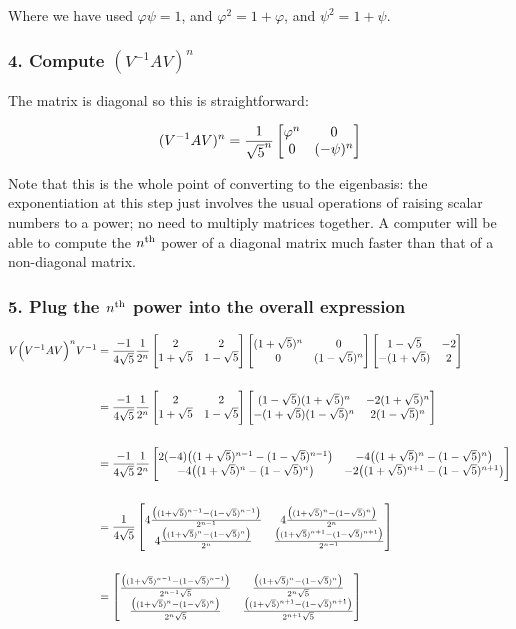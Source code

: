 \begin{lemma}
{Where we have used $\varphi\psi = 1$, and $\varphi^2 = 1 + \varphi$, and $\psi^2 = 1 + \psi$.



\subsubsection{4. Compute $(V^{-1}AV)^n$}

The matrix is diagonal so this is straightforward:

\begin{align*}
(V^{-1}AV)^n = \frac{1}{\sqrt{5}^n} \begin{bmatrix}\varphi^n & 0    \\0  & (-\psi)^n\\ \end{bmatrix}
\end{align*}

Note that this is the whole point of converting to the eigenbasis: the exponentiation at this step
just involves the usual operations of raising scalar numbers to a power; no need to multiply
matrices together. A computer will be able to compute the $n^{\text{th}}$ power of a diagonal matrix much
faster than that of a non-diagonal matrix.



\subsubsection{5. Plug the $n^{\text{th}}$ power into the overall expression}

\begin{align*}
V \Big(V^{-1}AV\Big)^n V^{-1}
&=
\frac{-1}{4\sqrt 5}
\frac{1}{2^n}
\begin{bmatrix}2           & 2          \\1 + \sqrt 5 & 1 - \sqrt 5\\ \end{bmatrix}
\begin{bmatrix}(1 + \sqrt 5)^n & 0              \\0               & (1 - \sqrt 5)^n\\ \end{bmatrix}
\begin{bmatrix}1 - \sqrt 5  & -2\\-(1 + \sqrt 5) & 2\\ \end{bmatrix}
\\\\
&=
\frac{-1}{4\sqrt 5}
\frac{1}{2^n}
\begin{bmatrix}2           & 2          \\1 + \sqrt 5 & 1 - \sqrt 5\\ \end{bmatrix}
\begin{bmatrix}(1 - \sqrt 5)(1 + \sqrt 5)^n & -2(1 + \sqrt 5)^n\\-(1 + \sqrt 5)(1 - \sqrt 5)^n & 2(1 - \sqrt 5)^n\\ \end{bmatrix}
\\\\
&=
\frac{-1}{4\sqrt 5}
\frac{1}{2^n}
\begin{bmatrix}2(-4)\big((1 + \sqrt 5)^{n-1} - (1 - \sqrt 5)^{n-1}\big) & -4\big((1 + \sqrt 5)^n     - (1 - \sqrt 5)^n    \big)\\   -4\big((1 + \sqrt 5)^n     - (1 - \sqrt 5)^n    \big) & -2\big((1 + \sqrt 5)^{n+1} - (1 - \sqrt 5)^{n+1}\big)\\ \end{bmatrix}
\\\\
&=
\frac{1}{4\sqrt 5}
\begin{bmatrix}4\frac{\big((1 + \sqrt 5)^{n-1} - (1 - \sqrt 5)^{n-1}\big)}{2^{n-1}} & 4\frac{\big((1 + \sqrt 5)^n     - (1 - \sqrt 5)^n    \big)}{2^n    }\\4\frac{\big((1 + \sqrt 5)^n     - (1 - \sqrt 5)^n    \big)}{2^n    } &  \frac{\big((1 + \sqrt 5)^{n+1} - (1 - \sqrt 5)^{n+1}\big)}{2^{n-1}}\\ \end{bmatrix}
\\\\
&=
\begin{bmatrix}\frac{\big((1 + \sqrt 5)^{n-1} - (1 - \sqrt 5)^{n-1}\big)}{2^{n-1}\sqrt 5} & \frac{\big((1 + \sqrt 5)^n     - (1 - \sqrt 5)^n    \big)}{2^n    \sqrt 5}\\\frac{\big((1 + \sqrt 5)^n     - (1 - \sqrt 5)^n    \big)}{2^n    \sqrt 5} & \frac{\big((1 + \sqrt 5)^{n+1} - (1 - \sqrt 5)^{n+1}\big)}{2^{n+1}\sqrt 5}\\ \end{bmatrix}
\end{align*}


}
\end{lemma}
